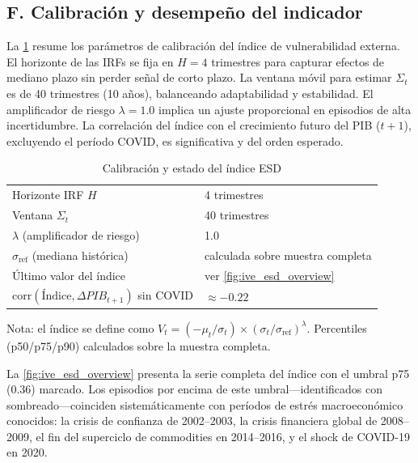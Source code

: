 \documentclass[11pt,a4paper]{article}
\numberwithin{equation}{section}
\begin{document}
\subsection*{F. Calibración y desempeño del indicador}

La \cref{tab:esd_calibration} resume los parámetros de calibración del índice de vulnerabilidad externa. El horizonte de las IRFs se fija en $H=4$ trimestres para capturar efectos de mediano plazo sin perder señal de corto plazo. La ventana móvil para estimar $\Sigma_t$ es de 40 trimestres (10 años), balanceando adaptabilidad y estabilidad. El amplificador de riesgo $\lambda = 1.0$ implica un ajuste proporcional en episodios de alta incertidumbre. La correlación del índice con el crecimiento futuro del PIB ($t+1$), excluyendo el período COVID, es significativa y del orden esperado.

\begin{table}[ht]
\centering
\begin{threeparttable}
\caption{Calibración y estado del índice ESD}
\label{tab:esd_calibration}
\begin{tabular}{l l}
\toprule
Horizonte IRF \(H\) & 4 trimestres \\
Ventana \(\Sigma_t\) & 40 trimestres \\
\(\lambda\) (amplificador de riesgo) & 1.0 \\
\(\sigma_{\text{ref}}\) (mediana histórica) & calculada sobre muestra completa \\
Último valor del índice & ver \cref{fig:ive_esd_overview} \\
\(\mathrm{corr}(\text{Índice}, \Delta PIB_{t+1})\) sin COVID & $\approx -0.22$ \\
\bottomrule
\end{tabular}
\begin{tablenotes}\footnotesize
\item Nota: el índice se define como $V_t = (-\mu_t/\sigma_t) \times (\sigma_t/\sigma_{\text{ref}})^{\lambda}$. Percentiles (p50/p75/p90) calculados sobre la muestra completa.
\end{tablenotes}
\end{threeparttable}
\end{table}

La \cref{fig:ive_esd_overview} presenta la serie completa del índice con el umbral p75 (0.36) marcado. Los episodios por encima de este umbral—identificados con sombreado—coinciden sistemáticamente con períodos de estrés macroeconómico conocidos: la crisis de confianza de 2002--2003, la crisis financiera global de 2008--2009, el fin del superciclo de commodities en 2014--2016, y el shock de COVID-19 en 2020.
\end{document}
